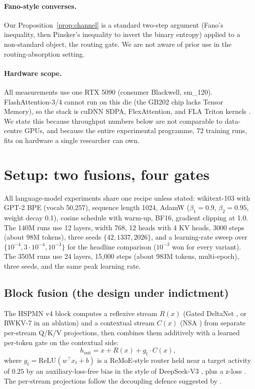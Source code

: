 \documentclass[11pt,a4paper]{article}
\begin{document}
\paragraph{Fano-style converses.} Our Proposition~\ref{prop:channel} is a
standard two-step argument (Fano's inequality, then Pinsker's inequality
to invert the binary entropy) applied to a non-standard object, the
routing gate. We are not aware of prior use in the routing-absorption
setting.

\paragraph{Hardware scope.} All measurements use one RTX 5090 (consumer
Blackwell, sm\_120). FlashAttention-3/4 cannot run on this die (the GB202
chip lacks Tensor Memory), so the stack is cuDNN SDPA, FlexAttention, and
FLA Triton kernels \citep{fla_lib}. We state this because throughput
numbers below are not comparable to data-centre GPUs, and because the
entire experimental programme, 72 training runs, fits on hardware a
single researcher can own.

\section{Setup: two fusions, four gates}
\label{sec:setup}

All language-model experiments share one recipe unless stated: wikitext-103
with GPT-2 BPE (vocab 50{,}257), sequence length 1024, AdamW
($\beta_1{=}0.9$, $\beta_2{=}0.95$, weight decay 0.1), cosine schedule with
warm-up, BF16, gradient clipping at 1.0. The 140M runs use 12 layers,
width 768, 12 heads with 4 KV heads, 3000 steps (about 98M tokens), three
seeds $\{42, 1337, 2026\}$, and a learning-rate sweep over
$\{10^{-4}, 3{\cdot}10^{-4}, 10^{-3}\}$ for the headline comparison
($10^{-3}$ won for every variant). The 350M runs use 24 layers, 15{,}000
steps (about 983M tokens, multi-epoch), three seeds, and the same peak
learning rate.

\subsection{Block fusion (the design under indictment)}
\label{sec:setup-block}

The HSPMN v4 block computes a reflexive stream $R(x)$ (Gated DeltaNet
\citep{gateddeltanet}, or RWKV-7 \citep{rwkv7} in an ablation) and a
contextual stream $C(x)$ (NSA \citep{nsa}) from separate per-stream Q/K/V
projections, then combines them additively with a learned per-token gate
on the contextual side:
\[
  h_{\text{out}} = x + R(x) + g_t \cdot C(x),
\]
where $g_t = \mathrm{ReLU}(w^\top x_t + b)$ is a ReMoE-style router
\citep{remoe} held near a target activity of $0.25$ by an
auxiliary-loss-free bias in the style of DeepSeek-V3 \citep{deepseekv3},
plus a z-loss \citep{stmoe}. The per-stream projections follow the
decoupling defence suggested by \citet{absorption2026}.
\end{document}
